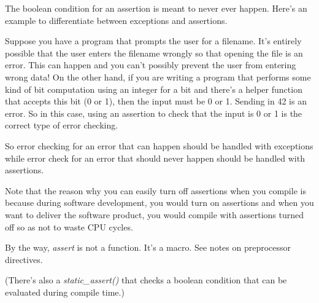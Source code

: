 \documentclass[
]{article}
\begin{document}
The boolean condition for an assertion is meant to never ever happen.
Here's an example to differentiate between exceptions and assertions.

Suppose you have a program that prompts the user for a filename. It's
entirely possible that the user enters the filename wrongly so that
opening the file is an error. This can happen and you can't possibly
prevent the user from entering wrong data! On the other hand, if you are
writing a program that performs some kind of bit computation using an
integer for a bit and there's a helper function that accepts this bit (0
or 1), then the input must be 0 or 1. Sending in 42 is an error. So in
this case, using an assertion to check that the input is 0 or 1 is the
correct type of error checking.

So error checking for an error that can happen should be handled with
exceptions while error check for an error that should never happen
should be handled with assertions.

Note that the reason why you can easily turn off assertions when you
compile is because during software development, you would turn on
assertions and when you want to deliver the software product, you would
compile with assertions turned off so as not to waste CPU cycles.

By the way, \emph{assert} is not a function. It's a macro. See notes on
preprocessor directives.

(There's also a \emph{static\_assert()} that checks a boolean condition
that can be evaluated during compile time.)
\end{document}
